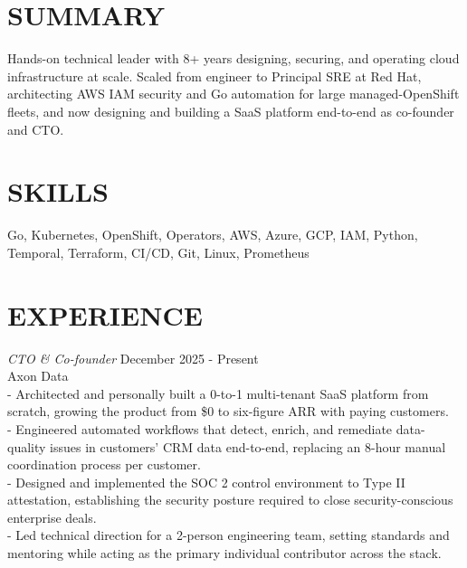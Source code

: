 \documentclass[line,margin]{res}
\begin{document}
\address{fahlmantaylor@gmail.com}
\address{github.com/fahlmant, linkedin.com/in/taylorfahlman}
\begin{resume}

                    
\section{SUMMARY}
                    Hands-on technical leader with 8+ years designing, securing, and operating cloud infrastructure at scale. Scaled from engineer to Principal SRE at Red Hat, architecting AWS IAM security and Go automation for large managed-OpenShift fleets, and now designing and building a SaaS platform end-to-end as co-founder and CTO.

\section{SKILLS}
                    Go, Kubernetes, OpenShift, Operators, AWS, Azure, GCP, IAM, Python, Temporal, Terraform, CI/CD, Git, Linux, Prometheus
                    
\section{EXPERIENCE}

                    {\sl CTO \& Co-founder} \hfill December 2025 - Present\\
                    Axon Data\\
                    - Architected and personally built a 0-to-1 multi-tenant SaaS platform from scratch, growing the product from \$0 to six-figure ARR with paying customers.\\
                    - Engineered automated workflows that detect, enrich, and remediate data-quality issues in customers' CRM data end-to-end, replacing an 8-hour manual coordination process per customer.\\
                    - Designed and implemented the SOC 2 control environment to Type II attestation, establishing the security posture required to close security-conscious enterprise deals.\\
                    - Led technical direction for a 2-person engineering team, setting standards and mentoring while acting as the primary individual contributor across the stack.


\end{resume}
\end{document}
